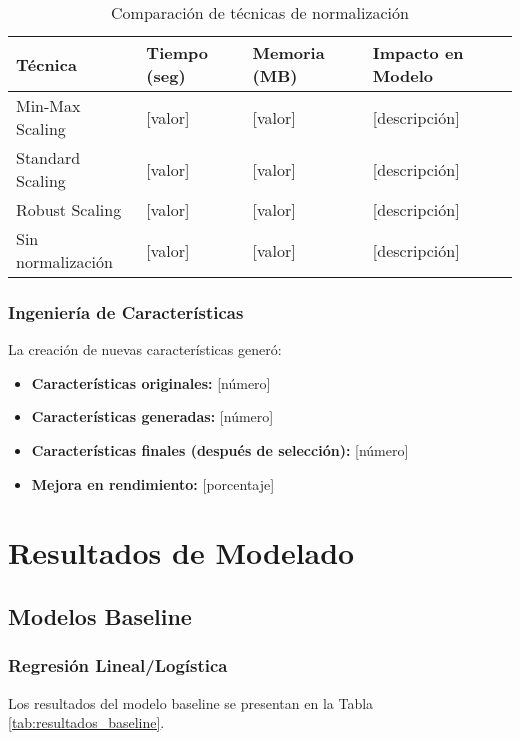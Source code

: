 \begin{table}[htbp]
\centering
\caption{Comparación de técnicas de normalización}
\begin{tabular}{@{}p{4cm}p{3cm}p{3cm}p{3cm}@{}}
\toprule
\textbf{Técnica} & \textbf{Tiempo (seg)} & \textbf{Memoria (MB)} & \textbf{Impacto en Modelo} \\
\midrule
Min-Max Scaling & [valor] & [valor] & [descripción] \\
Standard Scaling & [valor] & [valor] & [descripción] \\
Robust Scaling & [valor] & [valor] & [descripción] \\
Sin normalización & [valor] & [valor] & [descripción] \\
\bottomrule
\end{tabular}
\label{tab:normalizacion}
\end{table}

\subsubsection{Ingeniería de Características}

La creación de nuevas características generó:

\begin{itemize}
    \item \textbf{Características originales:} [número]
    \item \textbf{Características generadas:} [número]
    \item \textbf{Características finales (después de selección):} [número]
    \item \textbf{Mejora en rendimiento:} [porcentaje]%
\end{itemize}

\section{Resultados de Modelado}

\subsection{Modelos Baseline}

\subsubsection{Regresión Lineal/Logística}

Los resultados del modelo baseline se presentan en la Tabla \ref{tab:resultados_baseline}.

